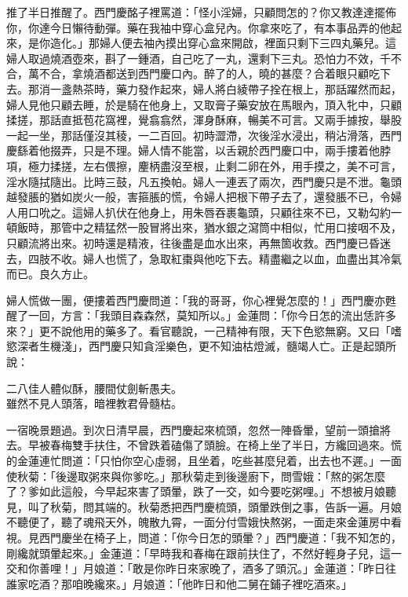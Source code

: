 推了半日推醒了。西門慶酩子裡罵道：「怪小淫婦，只顧問怎的？你又教達達擺佈你，你達今日懶待動彈。藥在我袖中穿心盒兒內。你拿來吃了，有本事品弄的他起來，是你造化。」那婦人便去袖內摸出穿心盒來開啟，裡面只剩下三四丸藥兒。這婦人取過燒酒壺來，斟了一鍾酒，自己吃了一丸，還剩下三丸。恐怕力不效，千不合，萬不合，拿燒酒都送到西門慶口內。{}醉了的人，曉的甚麼？合着眼只顧吃下去。那消一盞熱茶時，藥力發作起來，婦人將白綾帶子拴在根上，那話躍然而起，婦人見他只顧去睡，於是騎在他身上，又取膏子藥安放在馬眼內，頂入牝中，只顧揉搓，那話直抵苞花窩裡，覺翕翕然，渾身酥麻，暢美不可言。{}又兩手據按，舉股一起一坐，那話僅沒其稜，一二百回。初時澀滯，次後淫水浸出，稍沾滑落，西門慶繇着他掇弄，只是不理。婦人情不能當，以舌親於西門慶口中，兩手摟着他脖項，極力揉搓，左右偎擦，麈柄盡沒至根，止剩二卵在外，用手摸之，美不可言，淫水隨拭隨出。比時三鼓，凡五換帕。婦人一連丟了兩次，西門慶只是不泄。龜頭越發脹的猶如炭火一般，害箍脹的慌，令婦人把根下帶子去了，還發脹不已，令婦人用口吮之。這婦人扒伏在他身上，用朱唇吞裹龜頭，只顧往來不已，又勒勾約一頓飯時，那管中之精猛然一股冒將出來，猶水銀之瀉筒中相似，忙用口接咽不及，只顧流將出來。初時還是精液，往後盡是血水出來，再無箇收救。{}西門慶已昏迷去，四肢不收。婦人也慌了，急取紅棗與他吃下去。精盡繼之以血，血盡出其冷氣而已。{}{}良久方止。

婦人慌做一團，便摟着西門慶問道：「我的哥哥，你心裡覺怎麼的！」西門慶亦甦醒了一回，方言：「我頭目森森然，莫知所以。」金蓮問：「你今日怎的流出恁許多來？」更不說他用的藥多了。看官聽說，一己精神有限，天下色慾無窮。又曰「嗜慾深者生機淺」，西門慶只知貪淫樂色，更不知油枯燈滅，髓竭人亡。正是起頭所說：

\begin{myquote} 
二八佳人體似酥，腰間仗劍斬愚夫。\\雖然不見人頭落，暗裡教君骨髓枯。{}
\end{myquote} 

一宿晚景題過。到次日清早晨，西門慶起來梳頭，忽然一陣昏暈，望前一頭搶將去。早被春梅雙手扶住，不曾跌着磕傷了頭臉。在椅上坐了半日，方纔回過來。慌的金蓮連忙問道：「只怕你空心虛弱，且坐着，吃些甚麼兒着，出去也不遲。」一面使秋菊：「後邊取粥來與你爹吃。」那秋菊走到後邊廚下，問雪娥：「熬的粥怎麼了？爹如此這般，今早起來害了頭暈，跌了一交，如今要吃粥哩。」不想被月娘聽見，叫了秋菊，問其端的。秋菊悉把西門慶梳頭，頭暈跌倒之事，告訴一遍。月娘不聽便了，聽了魂飛天外，魄散九霄，一面分付雪娥快熬粥，一面走來金蓮房中看視。{}見西門慶坐在椅子上，問道：「你今日怎的頭暈？」西門慶道：「我不知怎的，剛纔就頭暈起來。」金蓮道：「早時我和春梅在跟前扶住了，{}不然好輕身子兒，這一交和你善哩！」月娘道：「敢是你昨日來家晚了，酒多了頭沉。」金蓮道：「昨日往誰家吃酒？那咱晚纔來。」月娘道：「他昨日和他二舅在鋪子裡吃酒來。」

